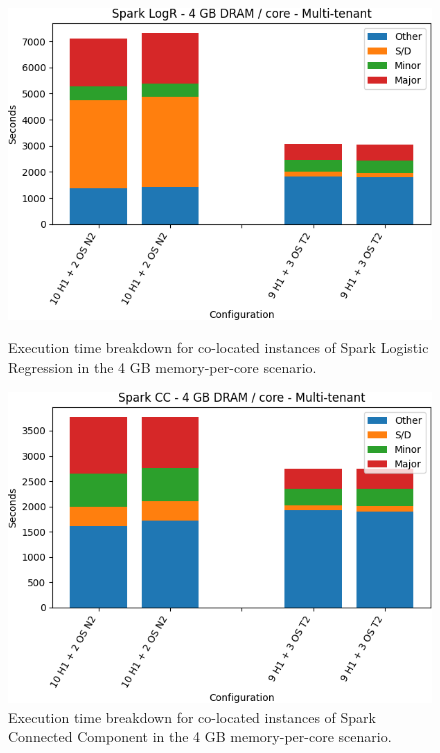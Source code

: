 \begin{figure}[thbp]
        \centering
    \includegraphics[width=\linewidth]{./fig/logr32.png}
    \caption{Execution time breakdown for co-located instances of Spark
    Logistic Regression in the 4 GB memory-per-core scenario.}
    \label{fig:logr32}

    \includegraphics[width=\linewidth]{./fig/cc32.png}
    \caption{Execution time breakdown for co-located instances of Spark
    Connected Component in the 4 GB memory-per-core scenario.}
    \label{fig:cc32}
\end{figure}

